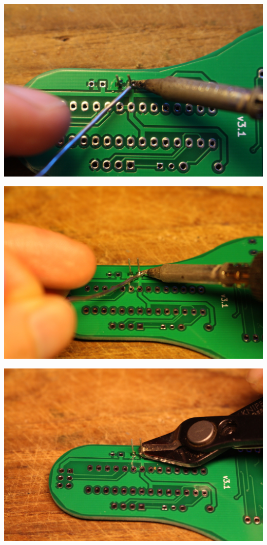 \documentclass{article}
\begin{document}
\begin{minipage}[b]{0.5\textwidth}
	\includegraphics[width=\textwidth]{Bilder2021/IMG_8126.JPG}
\end{minipage}
\begin{minipage}[b]{0.5\textwidth}
	\includegraphics[width=\textwidth]{Bilder2021/IMG_8127.JPG}
\end{minipage}

\vspace{0.5cm}

\begin{minipage}[b]{0.5\textwidth}
	\includegraphics[width=\textwidth]{Bilder2021/IMG_8128.JPG}
\end{minipage}
\end{document}
